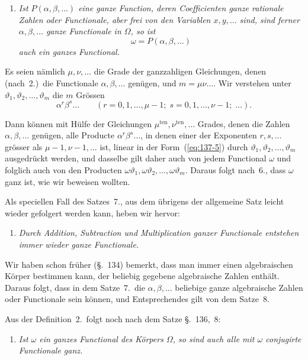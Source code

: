 \documentclass[12pt,a4paper]{article}
\theoremstyle{definition}
\begin{document}
\begin{enumerate}[label=\arabic*., resume]
\item \textit{Ist $P(\alpha,\beta,\dots)$ eine ganze Function, deren Coefficienten ganze rationale Zahlen oder Functionale, aber frei von den Variablen $x,y,\dots$ sind, sind ferner $\alpha,\beta,\dots$ ganze Functionale in $\Omega$, so ist}
\[
\omega = P(\alpha,\beta,\dots)
\]
\textit{auch ein ganzes Functional.}
\end{enumerate}

\newpage

Es seien nämlich $\mu,\nu,\dots$ die Grade der ganzzahligen Gleichungen, denen (nach~2.)\ die Functionale $\alpha,\beta,\dots$ genügen, und $m=\mu\nu\dots$. Wir verstehen unter $\vartheta_1,\vartheta_2,\dots,\vartheta_m$ die $m$ Grössen
\[
\alpha^r\beta^s\dots \qquad (r=0,1,\dots,\mu-1;\; s=0,1,\dots,\nu-1;\; \dots).
\]

Dann können mit Hülfe der Gleichungen $\mu^{\text{ten}},\nu^{\text{ten}},\dots$ Grades, denen die Zahlen $\alpha,\beta,\dots$ genügen, alle Producte $\alpha^r\beta^s\dots$, in denen einer der Exponenten $r,s,\dots$ grösser als $\mu-1,\nu-1,\dots$ ist, linear in der Form~(\ref{eq:137-5}) durch $\vartheta_1,\vartheta_2,\dots,\vartheta_m$ ausgedrückt werden, und dasselbe gilt daher auch von jedem Functional $\omega$ und folglich auch von den Producten $\omega\vartheta_1,\omega\vartheta_2,\dots,\omega\vartheta_m$. Daraus folgt nach~6., dass $\omega$ ganz ist, wie wir beweisen wollten.

Als speciellen Fall des Satzes~7., aus dem übrigens der allgemeine Satz leicht wieder gefolgert werden kann, heben wir hervor:

\begin{enumerate}[label=\arabic*., resume]
\item \textit{Durch Addition, Subtraction und Multiplication ganzer Functionale entstehen immer wieder ganze Functionale.}
\end{enumerate}

Wir haben schon früher (\S.~134) bemerkt, dass man immer einen algebraischen Körper bestimmen kann, der beliebig gegebene algebraische Zahlen enthält. Daraus folgt, dass in dem Satze~7.\ die $\alpha,\beta,\dots$ beliebige ganze algebraische Zahlen oder Functionale sein können, und Entsprechendes gilt von dem Satze~8.

Aus der Definition~2.\ folgt noch nach dem Satze \S.~136,~8:

\begin{enumerate}[label=\arabic*., resume]
\item \textit{Ist $\omega$ ein ganzes Functional des Körpers $\Omega$, so sind auch alle mit $\omega$ conjugirte Functionale ganz.}
\end{enumerate}
\end{document}
